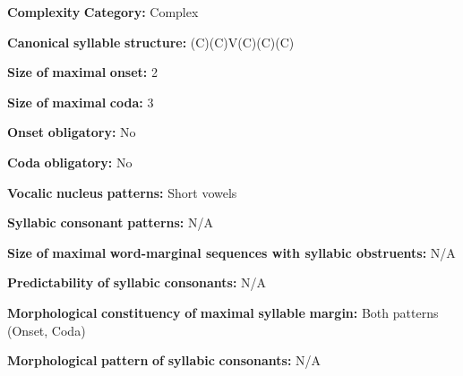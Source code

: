\begin{styleBody}
\textbf{Complexity} \textbf{Category:} Complex
\end{styleBody}

\begin{styleBody}
\textbf{Canonical} \textbf{syllable} \textbf{structure:} (C)(C)V(C)(C)(C) \citep[29-30]{Shiraishi2006}
\end{styleBody}

\begin{styleBody}
\textbf{Size} \textbf{of} \textbf{maximal} \textbf{onset:} 2
\end{styleBody}

\begin{styleBody}
\textbf{Size} \textbf{of} \textbf{maximal} \textbf{coda:} 3
\end{styleBody}

\begin{styleBody}
\textbf{Onset} \textbf{obligatory:} No
\end{styleBody}

\begin{styleBody}
\textbf{Coda} \textbf{obligatory:} No
\end{styleBody}

\begin{styleBody}
\textbf{Vocalic} \textbf{nucleus} \textbf{patterns:} Short vowels
\end{styleBody}

\begin{styleBody}
\textbf{Syllabic} \textbf{consonant} \textbf{patterns:} N/A
\end{styleBody}

\begin{styleBody}
\textbf{Size} \textbf{of} \textbf{maximal} \textbf{word{}-marginal sequences with syllabic obstruents:} N/A
\end{styleBody}

\begin{styleBody}
\textbf{Predictability} \textbf{of} \textbf{syllabic} \textbf{consonants:} N/A
\end{styleBody}

\begin{styleBody}
\textbf{Morphological} \textbf{constituency} \textbf{of} \textbf{maximal} \textbf{syllable} \textbf{margin:} Both patterns (Onset, Coda)
\end{styleBody}

\begin{styleBody}
\textbf{Morphological} \textbf{pattern} \textbf{of} \textbf{syllabic} \textbf{consonants:} N/A
\end{styleBody}

